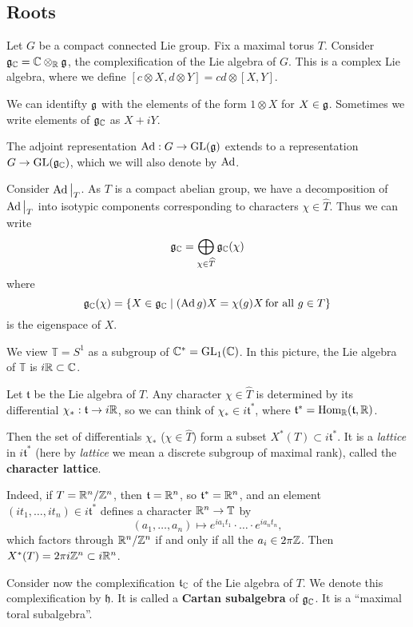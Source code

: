 \documentclass[11pt, english]{article}
\begin{document}
\subsection{Roots}

Let $G$ be a compact connected Lie group. Fix a maximal torus $T$. Consider $\mathfrak g_{\mathbb{C}}=\mathbb{C} \otimes_{\mathbb{R}} \mathfrak g$, the complexification of the Lie algebra of $G$. This is a complex Lie algebra, where we define $[c \otimes X, d \otimes Y]=cd \otimes [X,Y]$.

We can identifty $\mathfrak g$ with the elements of the form $1 \otimes X$ for $X \in \mathfrak g$. Sometimes we write elements of $\mathfrak g_{\mathbb{C}}$ as $X+iY$.

The adjoint representation $\operatorname{Ad}:G \to \operatorname{GL}(\mathfrak g)$ extends to a representation $G \to \operatorname{GL}(\mathfrak g_{\mathbb{C}})$, which we will also denote by $\operatorname{Ad}$.

Consider $\restr{\Ad}{T}$. As $T$ is a compact abelian group, we have a decomposition of $\restr{\Ad}{T}$ into isotypic components corresponding to characters $\chi \in \widehat T$. Thus we can write
$$
\mathfrak g_{\mathbb{C}} = \bigoplus_{\chi \in \widehat T} \mathfrak g_{\mathbb{C}}(\chi)
$$
where
$$
\mathfrak g_{\mathbb{C}}(\chi) = \{ X \in \mathfrak g_{\mathbb{C}} \mid (\operatorname{Ad} g)X = \chi(g) X \, \text{for all } g \in T \}
$$
is the eigenspace of $X$.

We view $\mathbb T = S^1$ as a subgroup of $\mathbb{C}^\ast = \operatorname{GL}_1(\mathbb{C})$. In  this picture, the Lie algebra of $\mathbb T$ is $i \mathbb{R} \subset \mathbb{C}$.

Let $\mathfrak t$ be the Lie algebra of $T$. Any character $\chi \in \widehat T$ is determined by its differential $\chi_\ast:\mathfrak t \to i \mathbb{R}$, so we can think of $\chi_\ast \in i \mathfrak t^\ast$, where $\mathfrak t ^\ast = \operatorname{Hom}_{\mathbb{R}}(\mathfrak t,\mathbb{R})$.

Then the set of differentials $\chi_\ast$ ($\chi \in \widehat T$) form a subset $X^\ast(T) \subset i \mathfrak t ^\ast$. It is a \emph{lattice} in $i \mathfrak t^\ast$ (here by \emph{lattice} we mean a discrete subgroup of maximal rank), called the \textbf{character lattice}.

Indeed, if $T=\mathbb{R}^n/\mathbb{Z}^n$, then $\mathfrak t=\mathbb{R}^n$, so $\mathfrak t^\ast=\mathbb{R}^n$, and an element $(it_1,\ldots,it_n) \in i\mathfrak t^\ast$ defines a character $\mathbb{R}^n \to \mathbb T$ by 
$$
(a_1, \ldots,a_n) \mapsto e^{ia_1t_1}\cdot \ldots \cdot e^{ia_nt_n},
$$
which factors through $\mathbb{R}^n/\mathbb{Z}^n$ if and only if all the $a_i \in 2\pi \mathbb{Z}$. Then $X^\ast(T) = 2\pi i \mathbb{Z}^n \subset i \mathbb{R}^n$.

Consider now the complexification $\mathfrak t_{\mathbb{C}}$ of the Lie algebra of $T$. We denote this complexification by $\mathfrak h$. It is called a \textbf{Cartan subalgebra} of $\mathfrak g_{\mathbb{C}}$. It is a ``maximal toral subalgebra''.
\end{document}
